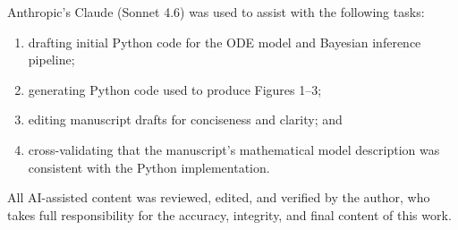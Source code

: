 \documentclass[12pt,letterpaper]{article}
\begin{document}
Anthropic's Claude (Sonnet 4.6) was used to assist with the following tasks: 
\begin{enumerate}
    \item[i)] drafting initial Python code for the ODE model and Bayesian inference pipeline; 
    \item[ii)] generating Python code used to produce Figures 1--3; 
    \item[iii)] editing manuscript drafts for conciseness and clarity; and
    \item[iv)] cross-validating that the manuscript's mathematical model description was consistent with the Python implementation.
\end{enumerate}

All AI-assisted content was reviewed, edited, and verified 
by the author, who takes full responsibility for the accuracy, integrity, and final content 
of this work.


\end{document}
